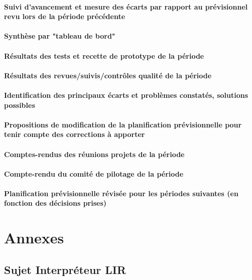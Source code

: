 \documentclass[12pt,a4paper,titlepage,openany, oneside]{report}
\begin{document}
    \subsection{Suivi d’avancement et mesure des écarts par rapport au prévisionnel revu lors de la période précédente}

    \subsection{Synthèse par "tableau de bord"}

    \subsection{Résultats des tests et recette de prototype de la période}

    \subsection{Résultats des revues/suivis/contrôles qualité de la période}

    \subsection{Identification des principaux écarts et problèmes constatés, solutions possibles}

    \subsection{Propositions de modification de la planification prévisionnelle pour tenir compte des corrections à apporter}

    \subsection{Comptes-rendus des réunions projets de la période}

    \subsection{Compte-rendu du comité de pilotage de la période}

    \subsection{Planification prévisionnelle révisée pour les périodes suivantes (en fonction des décisions prises)}


    \part{Annexes}

    \appendix
    \chapter{Sujet Interpréteur LIR}

    
    
\end{document}
